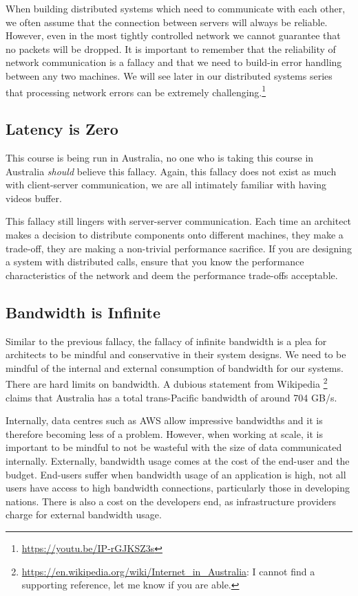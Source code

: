 When building distributed systems which need to communicate with each other,
we often assume that the connection between servers will always be reliable.
However, even in the most tightly controlled network we cannot guarantee that no packets will be dropped.
It is important to remember that the reliability of network communication is a fallacy and that we need to build-in error handling between any two machines.
We will see later in our distributed systems series that processing network errors can be extremely challenging.\footnote{\url{https://youtu.be/IP-rGJKSZ3s}}

\subsection{Latency is Zero}
This course is being run in Australia,
no one who is taking this course in Australia \textsl{should} believe this fallacy.
Again, this fallacy does not exist as much with client-server communication,
we are all intimately familiar with having videos buffer.

This fallacy still lingers with server-server communication.
Each time an architect makes a decision to distribute components onto different machines,
they make a trade-off,
they are making a non-trivial performance sacrifice.
If you are designing a system with distributed calls,
ensure that you know the performance characteristics of the network and deem the performance trade-offs acceptable.

\subsection{Bandwidth is Infinite}
Similar to the previous fallacy,
the fallacy of infinite bandwidth is a plea for architects to be mindful and conservative in their system designs.
We need to be mindful of the internal and external consumption of bandwidth for our systems.
There are hard limits on bandwidth.
A dubious statement from Wikipedia%
\footnote{\url{https://en.wikipedia.org/wiki/Internet_in_Australia}: I cannot find a supporting reference, let me know if you are able.} %
claims that Australia has a total trans-Pacific bandwidth of around 704 GB/s.

Internally, data centres such as AWS allow impressive bandwidths and it is therefore becoming less of a problem.
However, when working at scale,
it is important to be mindful to not be wasteful with the size of data communicated internally.
Externally, bandwidth usage comes at the cost of the end-user and the budget.
End-users suffer when bandwidth usage of an application is high,
not all users have access to high bandwidth connections, particularly those in developing nations.
There is also a cost on the developers end, as infrastructure providers charge for external bandwidth usage.

